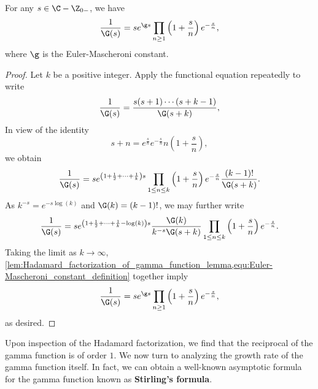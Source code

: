\documentclass[12pt]{article}
\begin{document}
    \begin{theorem}\label{thm:Hadamard_factorization_for_reciprocal_of_gamma}
      For any \(s \in \C-\Z_{0-}\), we have
      \[
        \frac{1}{\G(s)} = se^{\g s}\prod_{n \ge 1}\left(1+\frac{s}{n}\right)e^{-\frac{s}{n}},
      \]
      where \(\g\) is the Euler-Mascheroni constant.
    \end{theorem}
    \begin{proof}
      Let \(k\) be a positive integer. Apply the functional equation repeatedly to write
      \[
        \frac{1}{\G(s)} = \frac{s(s+1) \cdots (s+k-1)}{\G(s+k)},
      \]
      In view of the identity
      \[
       s+n = e^{\frac{s}{n}}e^{-\frac{s}{n}}n\left(1+\frac{s}{n}\right),
      \]
      we obtain
      \[
        \frac{1}{\G(s)} = se^{\left(1+\frac{1}{2}+\cdots+\frac{1}{k}\right)s}\prod_{1 \le n \le k}\left(1+\frac{s}{n}\right)e^{-\frac{s}{n}}\frac{(k-1)!}{\G(s+k)}.
      \]
      As \(k^{-s}= e^{-s\log(k)}\) and \(\G(k) = (k-1)!\), we may further write
      \[
        \frac{1}{\G(s)} = se^{\left(1+\frac{1}{2}+\cdots+\frac{1}{k}-\log(k)\right)s}\frac{\G(k)}{k^{-s}\G(s+k)}\prod_{1 \le n \le k}\left(1+\frac{s}{n}\right)e^{-\frac{s}{n}}.
      \]
      Taking the limit as \(k \to \infty\), \cref{lem:Hadamard_factorization_of_gamma_function_lemma,equ:Euler-Mascheroni_constant_definition} together imply
      \[
        \frac{1}{\G(s)} = se^{\g s}\prod_{n \ge 1}\left(1+\frac{s}{n}\right)e^{-\frac{s}{n}},
      \]
      as desired.
    \end{proof}

    Upon inspection of the Hadamard factorization, we find that the reciprocal of the gamma function is of order \(1\). We now turn to analyzing the growth rate of the gamma function itself. In fact, we can obtain a well-known asymptotic formula for the gamma function known as \textbf{Stirling's formula}.
\end{document}
